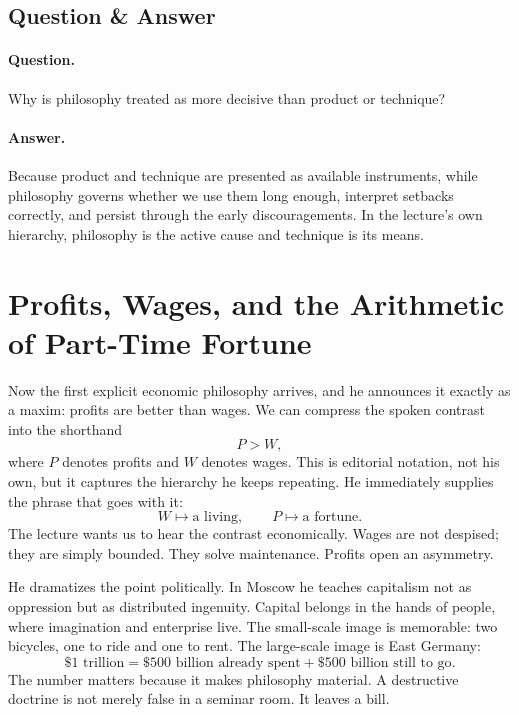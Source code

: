 \subsection{Question \& Answer}

\paragraph{Question.} Why is philosophy treated as more decisive than product or technique?

\paragraph{Answer.} Because product and technique are presented as available instruments, while philosophy governs whether we use them long enough, interpret setbacks correctly, and persist through the early discouragements. In the lecture's own hierarchy, philosophy is the active cause and technique is its means.

\section{Profits, Wages, and the Arithmetic of Part-Time Fortune}

Now the first explicit economic philosophy arrives, and he announces it exactly as a maxim: profits are better than wages. We can compress the spoken contrast into the shorthand
\begin{equation}
P > W,
\end{equation}
where \(P\) denotes profits and \(W\) denotes wages. This is editorial notation, not his own, but it captures the hierarchy he keeps repeating. He immediately supplies the phrase that goes with it:
\begin{equation}
W \longmapsto \text{a living},
\qquad
P \longmapsto \text{a fortune}.
\end{equation}
The lecture wants us to hear the contrast economically. Wages are not despised; they are simply bounded. They solve maintenance. Profits open an asymmetry.

He dramatizes the point politically. In Moscow he teaches capitalism not as oppression but as distributed ingenuity. Capital belongs in the hands of people, where imagination and enterprise live. The small-scale image is memorable: two bicycles, one to ride and one to rent. The large-scale image is East Germany:
\begin{equation}
\$1\text{ trillion}
=
\$500\text{ billion already spent}
+
\$500\text{ billion still to go}.
\end{equation}
The number matters because it makes philosophy material. A destructive doctrine is not merely false in a seminar room. It leaves a bill.

